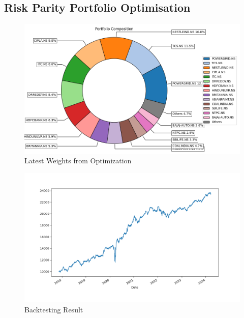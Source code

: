 \subsection{Risk Parity Portfolio Optimisation}

\begin{figure}[H]
   \centering
   \includegraphics[width=1\linewidth]{images/risk_parity/Weights.png}
   \caption{Latest Weights from Optimization}
   \label{fig:network_architecture1}
 \end{figure}

 \begin{figure}[H]
   \centering
   \includegraphics[width=1\linewidth]{images/risk_parity/backtest.png}
   \caption{Backtesting Result}
   \label{fig:network_architecture1}
 \end{figure}

